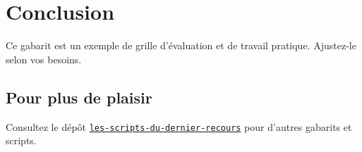 \documentclass[letterpaper, 12pt]{article}
\begin{document}
\section{Conclusion}

Ce gabarit est un exemple de grille d'évaluation et de travail pratique. Ajustez-le selon vos
besoins.


\subsection{Pour plus de plaisir}

Consultez le dépôt \href{https://github.com/archambaultv-prof/les-scripts-du-dernier-recours}
{\texttt{les-scripts-du-dernier-recours}} pour d'autres gabarits et scripts.
\end{document}
